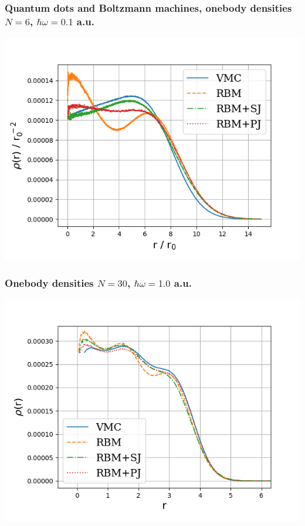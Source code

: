 \documentclass[11pt]{beamer} %
\begin{document}
\begin{frame}
\frametitle{Quantum dots and Boltzmann machines, onebody densities $N=6$, $\hbar\omega=0.1$ a.u.}


\vspace{6mm}

\centerline{\includegraphics[width=0.9\linewidth]{figures/OB6hw01.png}}

\vspace{6mm}

\end{frame}

\begin{frame}
\frametitle{Onebody densities $N=30$, $\hbar\omega=1.0$ a.u.}


\vspace{6mm}

\centerline{\includegraphics[width=0.9\linewidth]{figures/OB30hw1.png}}

\vspace{6mm}

\end{frame}
\end{document}

